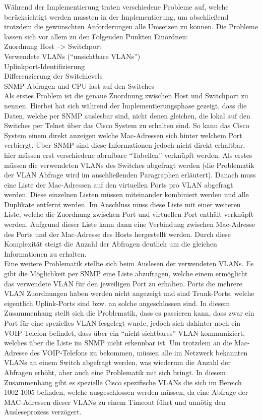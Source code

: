 Während der Implementierung traten verschiedene Probleme auf, welche berücksichtigt werden mussten in der Implementierung, um abschließend trotzdem die gewünschten Anforderungen alle Umsetzen zu können.
Die Probleme lassen sich vor allem zu den Folgenden Punkten Einordnen:\\
Zuordnung Host --> Switchport\\
Verwendete VLANs (“unsichtbare VLANs”)\\
Uplinkport-Identifizierung\\
Differenzierung der Switchlevels\\
SNMP Abfragen und CPU-last auf den Switches\\


Als erstes Problem ist die genaue Zuordnung zwischen Host und Switchport zu nennen.
Hierbei hat sich während der Implementierungsphase gezeigt, dass die Daten, welche per SNMP auslesbar sind, nicht denen gleichen, die lokal auf den Switches per Telnet über das Cisco System zu erhalten sind. So kann das Cisco System einem direkt anzeigen welche Mac-Adressen sich hinter welchem Port verbiergt. Über SNMP sind diese Informationen jedoch nicht direkt erhaltbar, hier müssen erst verschiedene abrufbare “Tabellen” verknüpft werden. Als erstes müssen die verwendeten VLANs des Switches abgefragt werden (die Problematik der VLAN Abfrage wird im anschließenden Paragraphen erläutert). Danach muss eine Liste der Mac-Adressen auf den virtuellen Ports pro VLAN abgefragt werden. Diese einzelnen Listen müssen miteinander kombiniert werden und alle Duplikate entfernt werden. Im Anschluss muss diese Liste mit einer weiteren Liste, welche die Zuordnung zwischen Port und virtuellen Port enthält verknüpft werden. Aufgrund dieser Liste kann dann eine Verbindung zwischen Mac-Adresse des Ports und der Mac-Adresse des Hosts hergestellt werden. Durch diese Komplexität steigt die Anzahl der Abfragen deutlich um die gleichen Informationen zu erhalten.\\
Eine weitere Problematik stellte sich beim Auslesen der verwendeten VLANs. Es gibt die Möglichkeit per SNMP eine Liste abzufragen, welche einem ermöglicht das verwendete VLAN für den jeweiligen Port zu erhalten. Ports die mehrere VLAN Zuordnungen haben werden nicht angezeigt und sind Trunk-Ports, welche eigentlich Uplink-Ports sind bzw. an solche angeschlossen sind. In diesem Zusammenhang stellt sich die Problematik, dass es passieren kann, dass zwar ein Port für eine spezielles VLAN fesgelegt wurde, jedoch sich dahinter noch ein VOIP-Telefon befindet, dass über ein “nicht sichtbares” VLAN kommuniziert, welches über die Liste im SNMP nicht erkennbar ist. Um trotzdem an die Mac-Adresse des VOIP-Telefons zu bekommen, müssen alle im Netzwerk bekannten VLANs an einem Switch abgefragt werden, was wiederum die Anzahl der Abfragen erhöht, aber auch eine Problematik mit sich bringt. In diesem Zusammenhang gibt es spezielle Cisco spezifische VLANs die sich im Bereich 1002-1005 befinden, welche ausgeschlossen werden müssen, da eine Abfrage der MAC-Adressen dieser VLANs zu einem Timeout führt und unnötig den Ausleseprozess verzögert.\\
